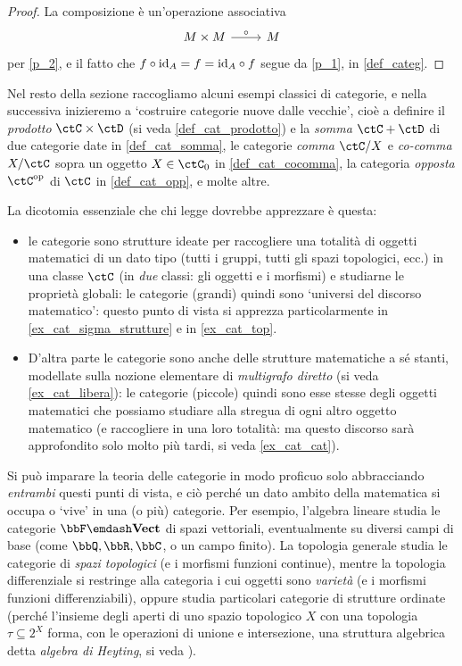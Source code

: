 \begin{proof}
	La composizione è un'operazione associativa
	\[\begin{tikzcd}
			M\times M \ar[r, "\circ"] & M
		\end{tikzcd}\]
	per \ref{p_2}, e il fatto che \(f\circ \mathrm{id}_A=f=\mathrm{id}_A\circ f\) segue da \ref{p_1}, in \ref{def_categ}.
\end{proof}
Nel resto della sezione raccogliamo alcuni esempi classici di categorie, e nella successiva inizieremo a `costruire categorie nuove dalle vecchie', cioè a definire il \emph{prodotto} \(\ctC\times\ctD\) (si veda \ref{def_cat_prodotto}) e la \emph{somma} \(\ctC+\ctD\) di due categorie date in \ref{def_cat_somma}, le categorie \emph{comma} \(\ctC/X\) e \emph{co-comma} \(X/\ctC\) sopra un oggetto \(X\in\ctC_0\) in \ref{def_cat_cocomma}, la categoria \emph{opposta} \(\ctC^\op\) di \(\ctC\) in \ref{def_cat_opp}, e molte altre.

La dicotomia essenziale che chi legge dovrebbe apprezzare è questa:
\begin{itemize}
	\item le categorie sono strutture ideate per raccogliere una totalità di oggetti matematici di un dato tipo (tutti i gruppi, tutti gli spazi topologici, ecc.) in una classe \(\ctC\) (in \emph{due} classi: gli oggetti e i morfismi) e studiarne le proprietà globali: le categorie (grandi) quindi sono `universi del discorso matematico': questo punto di vista si apprezza particolarmente in \ref{ex_cat_sigma_strutture} e in \ref{ex_cat_top}.
	\item D'altra parte le categorie sono anche delle strutture matematiche a sé stanti, modellate sulla nozione elementare di \emph{multigrafo diretto} (si veda \ref{ex_cat_libera}): le categorie (piccole) quindi sono esse stesse degli oggetti matematici che possiamo studiare alla stregua di ogni altro oggetto matematico (e raccogliere in una loro totalità: ma questo discorso sarà approfondito solo molto più tardi, si veda \ref{ex_cat_cat}).
\end{itemize}
Si può imparare la teoria delle categorie in modo proficuo solo abbracciando \emph{entrambi} questi punti di vista, e ciò perché un dato ambito della matematica si occupa o `vive' in una (o più) categorie. Per esempio, l'algebra lineare studia le categorie \(\bbF\emdash\ctVect\) di spazi vettoriali, eventualmente su diversi campi di base (come \(\bbQ,\bbR,\bbC\), o un campo finito). La topologia generale studia le categorie di \emph{spazi topologici} (e i morfismi funzioni continue), mentre la topologia differenziale si restringe alla categoria i cui oggetti sono \emph{varietà} (e i morfismi funzioni differenziabili), oppure studia particolari categorie di strutture ordinate (perché l'insieme degli aperti di uno spazio topologico \(X\) con una topologia \(\tau \subseteq 2^X\) forma, con le operazioni di unione e intersezione, una struttura algebrica detta \emph{algebra di Heyting}, si veda \cite{Esakia2019}).

